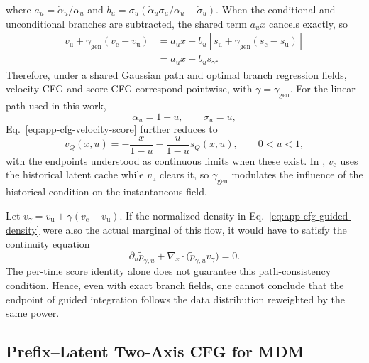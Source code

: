 where $a_u=\dot\alpha_u/\alpha_u$ and $b_u=\sigma_u(\dot\alpha_u\sigma_u/\alpha_u-\dot\sigma_u)$. When the conditional and unconditional branches are subtracted, the shared term $a_ux$ cancels exactly, so
\begin{equation}
\begin{aligned}
    v_{\mathrm u}
    +\gamma_{\mathrm{gen}}(v_{\mathrm c}-v_{\mathrm u})
    &=a_ux+b_u
      \left[s_{\mathrm u}
      +\gamma_{\mathrm{gen}}(s_{\mathrm c}-s_{\mathrm u})\right]\\
    &=a_ux+b_us_{\gamma}.
\end{aligned}
\label{eq:app-cfg-velocity-equivalence}
\end{equation}
Therefore, under a shared Gaussian path and optimal branch regression fields, velocity CFG and score CFG correspond pointwise, with $\gamma=\gamma_{\mathrm{gen}}$. For the linear path used in this work,
\begin{equation}
    \alpha_u=1-u,
    \qquad
    \sigma_u=u,
\end{equation}
Eq.~\eqref{eq:app-cfg-velocity-score} further reduces to
\begin{equation}
    v_Q(x,u)
    =-\frac{x}{1-u}
     -\frac{u}{1-u}s_Q(x,u),
    \qquad 0<u<1,
    \label{eq:app-cfg-linear-velocity}
\end{equation}
with the endpoints understood as continuous limits when these exist. In \method, $v_{\mathrm c}$ uses the historical latent cache while $v_{\mathrm u}$ clears it, so $\gamma_{\mathrm{gen}}$ modulates the influence of the historical condition on the instantaneous field.

Let $v_\gamma=v_{\mathrm u}+\gamma(v_{\mathrm c}-v_{\mathrm u})$. If the normalized density in Eq.~\eqref{eq:app-cfg-guided-density} were also the actual marginal of this flow, it would have to satisfy the continuity equation
\begin{equation}
    \partial_u\widetilde p_{\gamma,u}
    +\nabla_x\!\cdot\big(\widetilde p_{\gamma,u}v_\gamma\big)=0.
    \label{eq:app-cfg-path-consistency}
\end{equation}
The per-time score identity alone does not guarantee this path-consistency condition. Hence, even with exact branch fields, one cannot conclude that the endpoint of guided integration follows the data distribution reweighted by the same power.

\subsection{Prefix--Latent Two-Axis CFG for MDM}
\label{app:prefix-cfg}

